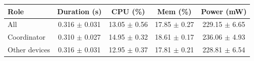 \begin{tabular}{lcccc}
\hline
\textbf{Role} & \textbf{Duration (s)} & \textbf{CPU (\%)} & \textbf{Mem (\%)} & \textbf{Power (mW)} \\
\hline
All & 0.316 $\pm$ 0.031 & 13.05 $\pm$ 0.56 & 17.85 $\pm$ 0.27 & 229.15 $\pm$ 6.65 \\
Coordinator & 0.310 $\pm$ 0.027 & 14.95 $\pm$ 0.32 & 18.61 $\pm$ 0.17 & 236.06 $\pm$ 4.93 \\
Other devices & 0.316 $\pm$ 0.031 & 12.95 $\pm$ 0.37 & 17.81 $\pm$ 0.21 & 228.81 $\pm$ 6.54 \\
\hline
\end{tabular}
